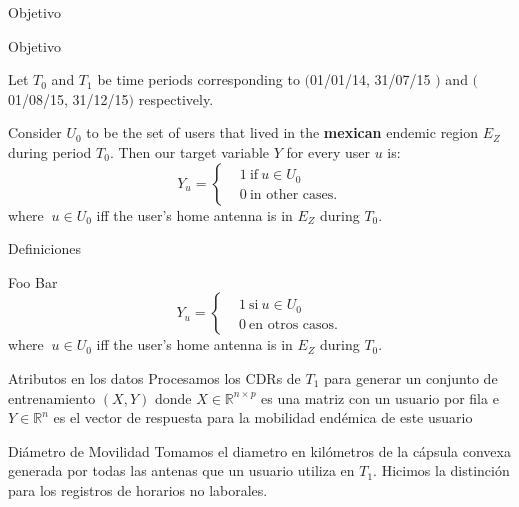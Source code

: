 \documentclass[xcolor=x11names]{beamer}
\begin{document}
\begin{frame}{Objetivo}

	\begin{block}{Objetivo}

			Let $T_0$ and $T_1$ be time periods corresponding to $($01/01/14, 31/07/15 $)$ and $($01/08/15, 31/12/15$)$ respectively.

			Consider $U_0$ to be the set of users that lived in the \textbf{mexican} endemic region $E_Z$ during period $T_0$. Then our target variable $Y$ for every user $u$ is:
			\[
			Y_u =
			\begin{cases}
			&1 \ \mbox{if} \ u \in U_0  \\
			&0 \ \mbox{in other cases}.
			\end{cases}
			\]
			where $\ u \in U_0$ iff the user's home antenna is in $E_Z$ during $T_0$.
			\end{block}




\begin{frame}{Definiciones}
			\begin{block}{Foo}
			Bar
			\[
			Y_u =
			\begin{cases}
			&1 \ \mbox{si} \ u \in U_0  \\
			&0 \ \mbox{en otros casos}.
			\end{cases}
			\]
			where $\ u \in U_0$ iff the user's home antenna is in $E_Z$ during $T_0$.
			\end{block}

\end{frame}

\begin{frame}{Atributos en los datos}
	Procesamos los CDRs de $T_1$ para generar un conjunto de entrenamiento $(X,Y)$ donde $X \in \mathbb{R}^{n \times p}$ es una matriz con un usuario por fila e $Y \in \mathbb{R}^n$ es el vector de respuesta para la mobilidad endémica de este usuario

	\bigskip

	\begin{block}{Diámetro de Movilidad}
		Tomamos el diametro en kilómetros de la cápsula convexa generada por todas las antenas que un usuario utiliza en $T_1$. Hicimos la distinción para los registros de horarios no laborales.
	\end{block}


\end{frame}
\end{frame}
\end{document}
